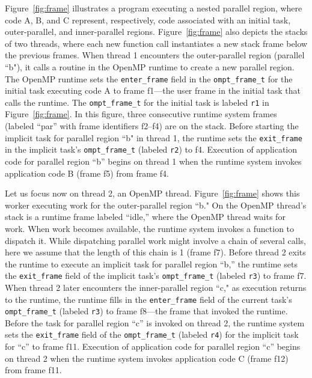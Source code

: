 \documentclass{article}
\begin{document}
\noindent
Figure~\ref{fig:frame} illustrates a program executing a nested parallel region, where code A, B, and C represent, respectively, code associated with an initial task, outer-parallel, and inner-parallel regions.  Figure~\ref{fig:frame}  also depicts the stacks of two threads, where each new function call instantiates a new stack frame below the previous frames. When thread 1 encounters the outer-parallel region (parallel ``b"), it calls a routine in the OpenMP runtime to create a new parallel region. The OpenMP runtime sets the \lstinline|enter_frame| field in the \lstinline|ompt_frame_t| for the initial task executing code A to  frame f1---the user frame in the initial task that calls the runtime. The  \lstinline|ompt_frame_t| for the initial task is labeled  \lstinline|r1| in Figure~\ref{fig:frame}. In this figure, three consecutive runtime system frames (labeled ``par'' with frame identifiers f2--f4) are on the stack. 
Before starting the implicit task for parallel region ``b" in thread 1, the runtime sets the \lstinline|exit_frame| in the implicit task's \lstinline|ompt_frame_t|  (labeled \lstinline|r2|) to f4. Execution of application code for parallel region ``b''  begins on thread 1  when the runtime system invokes application code B (frame f5) from frame f4. 

Let us focus now on thread 2, an OpenMP thread. Figure~\ref{fig:frame}  shows this worker executing  work for the outer-parallel region ``b."
On the OpenMP thread's stack is a runtime frame labeled ``idle,'' where the OpenMP thread waits for work. 
When work becomes available, the runtime system invokes a function to dispatch it. While dispatching parallel work might involve a chain of several calls, here we assume that the length of this chain is 1 (frame f7).  Before thread 2 exits the runtime to execute an implicit task for parallel region ``b,'' the runtime 
sets the \lstinline|exit_frame| field of the implicit task's \lstinline|ompt_frame_t| (labeled \lstinline|r3|) to frame f7. 
When thread 2 later encounters the inner-parallel region ``c,"  as execution returns to the runtime,  the runtime fills in the  \lstinline|enter_frame| field of the current task's \lstinline|ompt_frame_t| (labeled \lstinline|r3|) to frame f8---the frame that invoked the runtime. Before the task for parallel region ``c'' is invoked on thread 2, the runtime system sets the \lstinline|exit_frame| field  of the \lstinline|ompt_frame_t| (labeled \lstinline|r4|) for the implicit task for ``c'' 
to frame f11. Execution of application code for parallel region ``c''  begins on thread 2  when the runtime system invokes application code C (frame f12) from frame f11.
\end{document}

